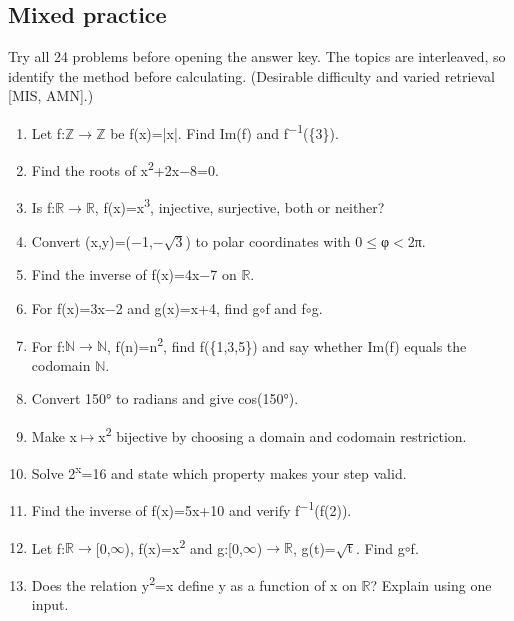 \documentclass[11pt]{article}
\begin{document}
\begin{keepsection}
\section{Mixed practice}

Try all 24 problems before opening the answer key. The topics are interleaved, so identify the method before calculating. (Desirable difficulty and varied retrieval [MIS, AMN].)

\begin{enumerate}
\item Let f:\ensuremath{\mathbb{Z}}\ensuremath{\to}\ensuremath{\mathbb{Z}} be f(x)=|x|. Find Im(f) and f\textsuperscript{\ensuremath{-}1}(\{3\}).
\item Find the roots of x\textsuperscript{2}+2x\ensuremath{-}8=0.
\item Is f:\ensuremath{\mathbb{R}}\ensuremath{\to}\ensuremath{\mathbb{R}}, f(x)=x\textsuperscript{3}, injective, surjective, both or neither?
\item Convert (x,y)=(\ensuremath{-}1,\ensuremath{-}\ensuremath{\sqrt{3}}) to polar coordinates with 0\ensuremath{\leq}φ\ensuremath{<}2π.
\item Find the inverse of f(x)=4x\ensuremath{-}7 on \ensuremath{\mathbb{R}}.
\item For f(x)=3x\ensuremath{-}2 and g(x)=x+4, find g\ensuremath{\circ}f and f\ensuremath{\circ}g.
\item For f:\ensuremath{\mathbb{N}}\ensuremath{\to}\ensuremath{\mathbb{N}}, f(n)=n\textsuperscript{2}, find f(\{1,3,5\}) and say whether Im(f) equals the codomain \ensuremath{\mathbb{N}}.
\item Convert 150° to radians and give cos(150°).
\item Make x\ensuremath{\mapsto}x\textsuperscript{2} bijective by choosing a domain and codomain restriction.
\item Solve 2\textsuperscript{x}=16 and state which property makes your step valid.
\item Find the inverse of f(x)=5x+10 and verify f\textsuperscript{\ensuremath{-}1}(f(2)).
\item Let f:\ensuremath{\mathbb{R}}\ensuremath{\to}[0,\ensuremath{\infty}), f(x)=x\textsuperscript{2} and g:[0,\ensuremath{\infty})\ensuremath{\to}\ensuremath{\mathbb{R}}, g(t)=\ensuremath{\sqrt{\mathrm{t}}}. Find g\ensuremath{\circ}f.
\item Does the relation y\textsuperscript{2}=x define y as a function of x on \ensuremath{\mathbb{R}}? Explain using one input.

\end{enumerate}
\end{keepsection}
\end{document}
